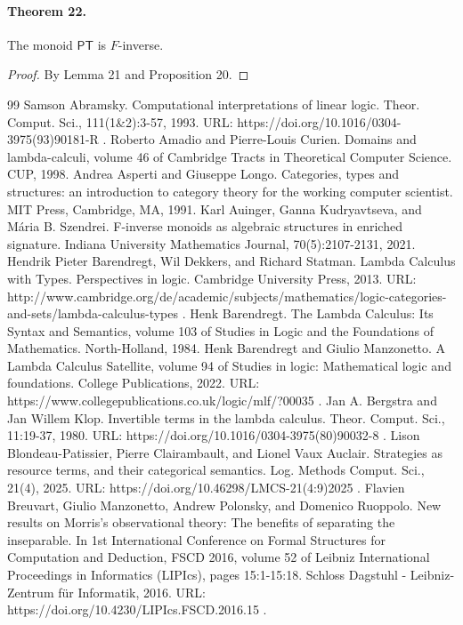 \documentclass[10pt,a4paper]{amsart}
\begin{document}
\paragraph{Theorem 22.} The monoid $\mathsf{PT}$ is $F$-inverse.

\begin{proof}
By Lemma 21 and Proposition 20.
\end{proof}

\begin{thebibliography}{99}
 Samson Abramsky. Computational interpretations of linear logic. Theor. Comput. Sci., 111(1\&2):3-57, 1993. URL: https://doi.org/10.1016/0304-3975(93)90181-R .
 Roberto Amadio and Pierre-Louis Curien. Domains and lambda-calculi, volume 46 of Cambridge Tracts in Theoretical Computer Science. CUP, 1998.
 Andrea Asperti and Giuseppe Longo. Categories, types and structures: an introduction to category theory for the working computer scientist. MIT Press, Cambridge, MA, 1991.
 Karl Auinger, Ganna Kudryavtseva, and Mária B. Szendrei. F-inverse monoids as algebraic structures in enriched signature. Indiana University Mathematics Journal, 70(5):2107-2131, 2021.
 Hendrik Pieter Barendregt, Wil Dekkers, and Richard Statman. Lambda Calculus with Types. Perspectives in logic. Cambridge University Press, 2013. URL: http://www.cambridge.org/de/academic/subjects/mathematics/logic-categories-and-sets/lambda-calculus-types .
 Henk Barendregt. The Lambda Calculus: Its Syntax and Semantics, volume 103 of Studies in Logic and the Foundations of Mathematics. North-Holland, 1984.
 Henk Barendregt and Giulio Manzonetto. A Lambda Calculus Satellite, volume 94 of Studies in logic: Mathematical logic and foundations. College Publications, 2022. URL: https://www.collegepublications.co.uk/logic/mlf/?00035 .
 Jan A. Bergstra and Jan Willem Klop. Invertible terms in the lambda calculus. Theor. Comput. Sci., 11:19-37, 1980. URL: https://doi.org/10.1016/0304-3975(80)90032-8 .
 Lison Blondeau-Patissier, Pierre Clairambault, and Lionel Vaux Auclair. Strategies as resource terms, and their categorical semantics. Log. Methods Comput. Sci., 21(4), 2025. URL: https://doi.org/10.46298/LMCS-21(4:9)2025 .
 Flavien Breuvart, Giulio Manzonetto, Andrew Polonsky, and Domenico Ruoppolo. New results on Morris’s observational theory: The benefits of separating the inseparable. In 1st International Conference on Formal Structures for Computation and Deduction, FSCD 2016, volume 52 of Leibniz International Proceedings in Informatics (LIPIcs), pages 15:1-15:18. Schloss Dagstuhl - Leibniz-Zentrum für Informatik, 2016. URL: https://doi.org/10.4230/LIPIcs.FSCD.2016.15 .

\end{thebibliography}
\end{document}
